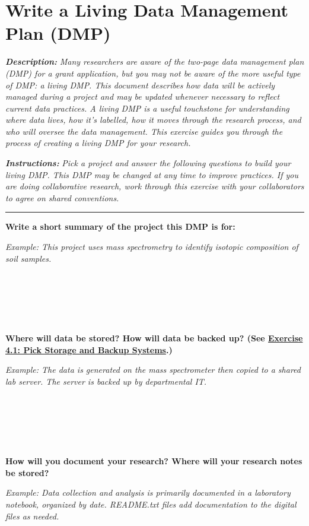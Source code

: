 \documentclass[
]{book}
\begin{document}
\newpage

\hypertarget{living-dmp}{%
\section{Write a Living Data Management Plan (DMP)}\label{living-dmp}}

\textbf{\emph{Description:}} \emph{Many researchers are aware of the two-page data management plan (DMP) for a grant application, but you may not be aware of the more useful type of DMP: a living DMP. This document describes how data will be actively managed during a project and may be updated whenever necessary to reflect current data practices. A living DMP is a useful touchstone for understanding where data lives, how it's labelled, how it moves through the research process, and who will oversee the data management. This exercise guides you through the process of creating a living DMP for your research.}

\textbf{\emph{Instructions:}} \emph{Pick a project and answer the following questions to build your living DMP. This DMP may be changed at any time to improve practices. If you are doing collaborative research, work through this exercise with your collaborators to agree on shared conventions.}

\begin{center}\rule{0.5\linewidth}{0.5pt}\end{center}

\textbf{Write a short summary of the project this DMP is for:}

\emph{Example: This project uses mass spectrometry to identify isotopic composition of soil samples.}

~

~

~

\textbf{Where will data be stored? How will data be backed up? (See \protect\hyperlink{storage}{Exercise 4.1: Pick Storage and Backup Systems}.)}

\emph{Example: The data is generated on the mass spectrometer then copied to a shared lab server. The server is backed up by departmental IT.}

~

~

~

\textbf{How will you document your research? Where will your research notes be stored?}

\emph{Example: Data collection and analysis is primarily documented in a laboratory notebook, organized by date. README.txt files add documentation to the digital files as needed.}
\end{document}
